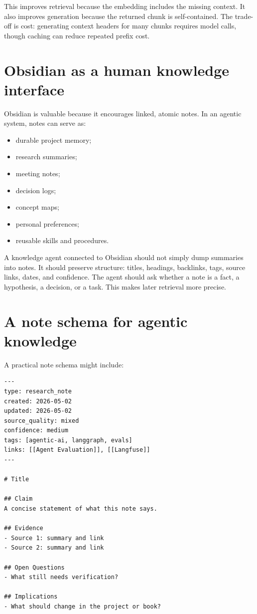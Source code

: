 This improves retrieval because the embedding includes the missing context. It also improves generation because the returned chunk is self-contained. The trade-off is cost: generating context headers for many chunks requires model calls, though caching can reduce repeated prefix cost.

\section{Obsidian as a human knowledge interface}

Obsidian is valuable because it encourages linked, atomic notes. In an agentic system, notes can serve as:

\begin{itemize}[leftmargin=*]
  \item durable project memory;
  \item research summaries;
  \item meeting notes;
  \item decision logs;
  \item concept maps;
  \item personal preferences;
  \item reusable skills and procedures.
\end{itemize}

A knowledge agent connected to Obsidian should not simply dump summaries into notes. It should preserve structure: titles, headings, backlinks, tags, source links, dates, and confidence. The agent should ask whether a note is a fact, a hypothesis, a decision, or a task. This makes later retrieval more precise.

\section{A note schema for agentic knowledge}

A practical note schema might include:

\begin{lstlisting}
---
type: research_note
created: 2026-05-02
updated: 2026-05-02
source_quality: mixed
confidence: medium
tags: [agentic-ai, langgraph, evals]
links: [[Agent Evaluation]], [[Langfuse]]
---

# Title

## Claim
A concise statement of what this note says.

## Evidence
- Source 1: summary and link
- Source 2: summary and link

## Open Questions
- What still needs verification?

## Implications
- What should change in the project or book?
\end{lstlisting}


